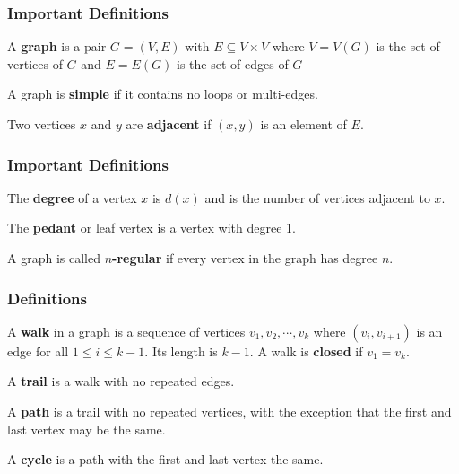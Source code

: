 \documentclass{beamer}
\begin{document}
\frame
{
  \frametitle{Important Definitions}

\begin{definition}[Graph]
A {\bf graph} is a pair $G=(V,E)$ with $E \subseteq V\times V$ where $V=V(G)$ is the set of vertices of $G$ and $E=E(G)$ is the set of edges of $G$
\end{definition}

\begin{definition}[Simple]
A graph is {\bf simple} if it contains no loops or multi-edges.
\end{definition}

\begin{definition}[Adjacent]
Two vertices $x$ and $y$ are {\bf adjacent} if $(x,y)$ is an element of  $E$.
\end{definition}


}

\frame
{
  \frametitle{Important Definitions}



\begin{definition}
The {\bf degree} of a vertex $x$ is $d(x)$ and is the number of vertices adjacent to $x$.
\end{definition}

\begin{definition}
The {\bf pedant} or leaf  vertex is a vertex with degree 1.
\end{definition}


\begin{definition}[$n$-regular]
A graph is called {\bf $n$-regular} if every vertex in the graph has degree $n$.
\end{definition}




}





\frame
{
\frametitle{Definitions}
\begin{definition}[Walk]
A {\bf walk} in a graph is a sequence of vertices $v_1,v_2,\cdots,v_k$ where $(v_i, v_{i+1})$ is an edge for all $1 \leq i \leq k-1$. Its length is $k-1$. A walk is {\bf closed} if $v_1 = v_k$.
\end{definition}

\begin{definition}[Trail]
A {\bf trail} is a walk with no repeated edges.
\end{definition}

\begin{definition}[Path]
A {\bf path} is a trail with no repeated vertices, with the exception that the first and last vertex may be the same.
\end{definition}

\begin{definition}[Cycle]
A {\bf cycle} is a path with the first and last vertex the same.
\end{definition}

}
\end{document}
